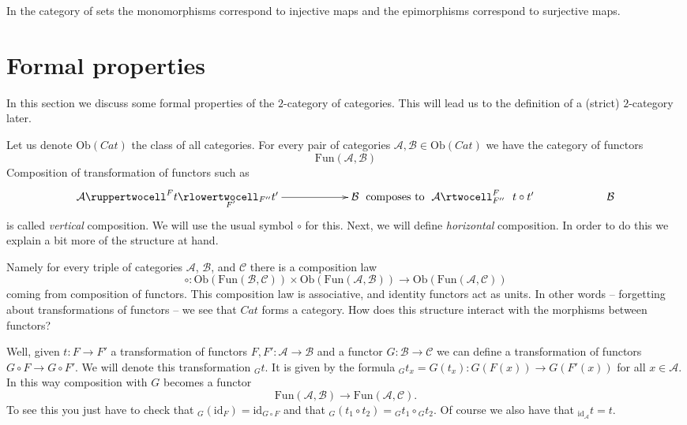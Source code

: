 \begin{example}
\label{example-mono-epi-sets}
In the category of sets the monomorphisms correspond to injective
maps and the epimorphisms correspond to surjective maps.
\end{example}

\section{Formal properties}
\label{section-formal-cat-cat}

\noindent
In this section we discuss some formal properties of the
$2$-category of categories. This will lead us to the definition
of a (strict) $2$-category later.

\medskip\noindent
Let us denote $\text{Ob}(\textit{Cat})$ the class of all categories.
For every pair of categories
$\mathcal{A}, \mathcal{B} \in \text{Ob}(\textit{Cat})$
we have the category of functors
$$
\text{Fun}(\mathcal{A}, \mathcal{B})
$$
Composition of transformation of functors 
such as
$$
\xymatrixcolsep{5pc}
\xymatrix{
\mathcal{A}
\ruppertwocell^F{t}
\ar[r]_(.3){F'}
\rlowertwocell_{F''}{t'}
&
\mathcal{B}
}
\text{ composes to }
\xymatrix{
\mathcal{A}
\rtwocell^F_{F''}{\ \ t \circ t'}
&
\mathcal{B}
}
$$
is called {\it vertical} composition. We will use the usual
symbol $\circ$ for this. Next, we will define {\it horizontal}
composition. In order to do this we explain a bit more 
of the structure at hand.

\medskip\noindent
Namely for every triple
of categories $\mathcal{A}$, $\mathcal{B}$, and $\mathcal{C}$
there is a composition law
$$
\circ : \text{Ob}(\text{Fun}(\mathcal{B}, \mathcal{C}))
\times 
\text{Ob}(\text{Fun}(\mathcal{A}, \mathcal{B}))
\longrightarrow
\text{Ob}(\text{Fun}(\mathcal{A}, \mathcal{C}))
$$
coming from composition of functors. This composition law
is associative, and identity functors act as units. In other
words -- forgetting about transformations of functors --
we see that $\textit{Cat}$ forms a category. How does
this structure interact with the morphisms between functors?

\medskip\noindent
Well, given $t : F \to F'$ a transformation of
functors $F, F' : \mathcal{A} \to \mathcal{B}$ and
a functor
$G : \mathcal{B} \to \mathcal{C}$ we can define
a transformation of functors
$G\circ F \to G \circ F'$. We will denote this
transformation ${}_Gt$. It is given by the formula
${}_Gt_x = G(t_x) : G(F(x)) \to G(F'(x))$
for all $x \in \mathcal{A}$. 
In this way composition
with $G$ becomes a functor
$$
\text{Fun}(\mathcal{A}, \mathcal{B})
\longrightarrow
\text{Fun}(\mathcal{A}, \mathcal{C}).
$$
To see this you just have to check that
${}_G(\text{id}_F) = \text{id}_{G \circ F}$ and that
${}_G(t_1 \circ t_2) = {}_Gt_1 \circ {}_Gt_2$.
Of course we also have that ${}_{\text{id}_{\mathcal{A}}}t = t$.

